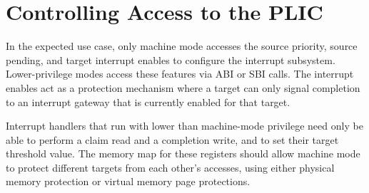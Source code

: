 \section{Controlling Access to the PLIC}

In the expected use case, only machine mode accesses the source
priority, source pending, and target interrupt enables to configure
the interrupt subsystem.  Lower-privilege modes access these features
via ABI or SBI calls. The interrupt enables act as a protection
mechanism where a target can only signal completion to an interrupt
gateway that is currently enabled for that target.

Interrupt handlers that run with lower than machine-mode privilege
need only be able to perform a claim read and a completion write, and
to set their target threshold value.  The memory map for these
registers should allow machine mode to protect different targets from
each other's accesses, using either physical memory protection or
virtual memory page protections.

